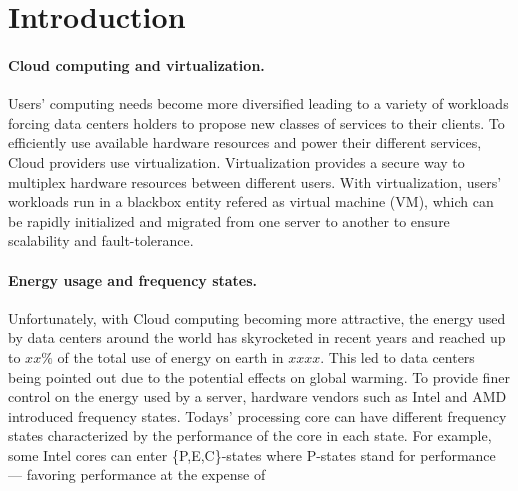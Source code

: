 \section{Introduction}
\label{introduction}

\paragraph{Cloud computing and virtualization.} 

Users' computing needs become more diversified leading to a variety of workloads\cite{} forcing data centers holders to propose new classes of services to their clients\cite{}.
To efficiently use available hardware resources and power their different services, Cloud providers use virtualization\cite{}.
Virtualization provides a secure way to multiplex hardware resources between different users\cite{}.
With virtualization, users' workloads run in a blackbox entity refered as virtual machine (VM), which can be rapidly initialized and migrated from one server to another to ensure scalability and fault-tolerance. 

\paragraph{Energy usage and frequency states.}
Unfortunately, with Cloud computing becoming more attractive, the energy used by data centers around the world has skyrocketed in recent years\cite{} and reached up to $xx\%$ of the total use of energy on earth in $xxxx$.
This led to data centers being pointed out due to the potential effects on global warming\cite{}. 
To provide finer control on the energy used by a server, hardware vendors such as Intel and AMD introduced frequency states\cite{}.
Todays' processing core can have different frequency states characterized by the performance of the core in each state. 
For example, some Intel cores can enter \{P,E,C\}-states where P-states stand for performance --- favoring performance at the expense of 
